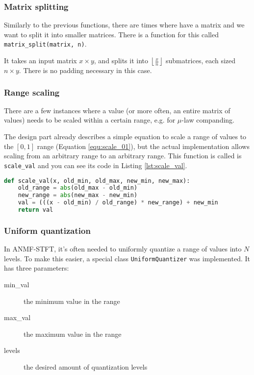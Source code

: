\subsubsection{Matrix splitting}
Similarly to the previous functions, there are times where have a matrix and we want to split it into smaller matrices. There is a function for this called \verb|matrix_split(matrix, n)|.

It takes an input matrix $x \times y$, and splits it into $\left\lfloor \frac{x}{n} \right\rfloor$ submatrices, each sized $n \times y$. There is no padding necessary in this case.

\subsubsection{Range scaling}
There are a few instances where a value (or more often, an entire matrix of values) needs to be scaled within a certain range, e.g. for $\mu$-law companding.

The design part already describes a simple equation to scale a range of values to the $[0,1]$ range (Equation \ref{equ:scale_01}), but the actual implementation allows scaling from an arbitrary range to an arbitrary range. This function is called is \verb|scale_val| and you can see its code in Listing \ref{lst:scale_val}.

\begin{minipage}{\linewidth}
\begin{lstlisting}[caption={Function for scaling value ranges}, label={lst:scale_val}, language=Python]
def scale_val(x, old_min, old_max, new_min, new_max):
	old_range = abs(old_max - old_min)
	new_range = abs(new_max - new_min)
	val = (((x - old_min) / old_range) * new_range) + new_min
	return val
\end{lstlisting}
\end{minipage}

\subsubsection{Uniform quantization}
In ANMF-STFT, it's often needed to uniformly quantize a range of values into $N$ levels. To make this easier, a special class \verb|UniformQuantizer| was implemented. It has three parameters:

\begin{description}
	\item[min\_val] the minimum value in the range
	\item[max\_val] the maximum value in the range
	\item[levels] the desired amount of quantization levels
\end{description}

